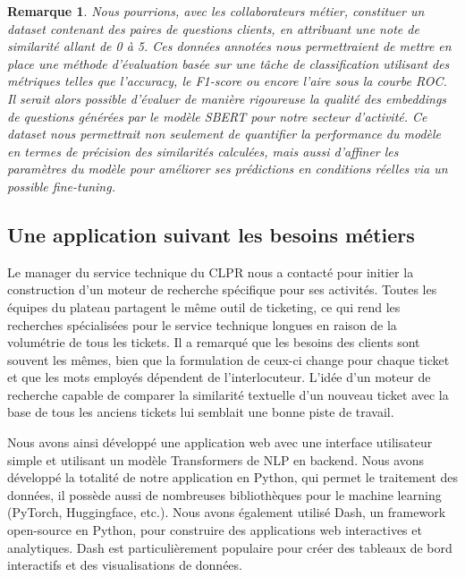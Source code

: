 \documentclass[12pt]{article}
\newtheorem{rmq}{Remarque}
\theoremstyle{definition}
\begin{document}
\begin{rmq}
	
	Nous pourrions, avec les collaborateurs métier, constituer un dataset contenant des paires de questions clients, en attribuant une note de similarité allant de 0 à 5. Ces données annotées nous permettraient de mettre en place une méthode d'évaluation basée sur une tâche de classification utilisant des métriques telles que l'accuracy, le F1-score ou encore l'aire sous la courbe ROC. Il serait alors possible d'évaluer de manière rigoureuse la qualité des embeddings de questions générées par le modèle SBERT pour notre secteur d'activité. Ce dataset nous permettrait non seulement de quantifier la performance du modèle en termes de précision des similarités calculées, mais aussi d'affiner les paramètres du modèle pour améliorer ses prédictions en conditions réelles via un possible fine-tuning.
	
	
\end{rmq}

\subsection{Une application suivant les besoins métiers}

Le manager du service technique du CLPR nous a contacté pour initier la construction d'un moteur de recherche spécifique pour ses activités. Toutes les équipes du plateau partagent le même outil de ticketing, ce qui rend les recherches spécialisées pour le service technique longues en raison de la volumétrie de tous les tickets. Il a remarqué que les besoins des clients sont souvent les mêmes, bien que la formulation de ceux-ci change pour chaque ticket et que les mots employés dépendent de l'interlocuteur. L'idée d'un moteur de recherche capable de comparer la similarité textuelle d'un nouveau ticket avec la base de tous les anciens tickets lui semblait une bonne piste de travail.

Nous avons ainsi développé une application web avec une interface utilisateur simple et utilisant un modèle Transformers de NLP en backend. Nous avons développé la totalité de notre application en Python, qui permet le traitement des données, il possède aussi de nombreuses bibliothèques pour le machine learning (PyTorch, Huggingface, etc.). Nous avons également utilisé Dash, un framework open-source en Python, pour construire des applications web interactives et analytiques. Dash est particulièrement populaire pour créer des tableaux de bord interactifs et des visualisations de données.
 
\end{document}
